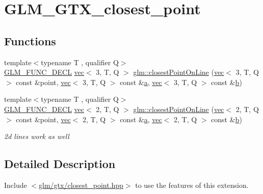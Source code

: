 \hypertarget{group__gtx__closest__point}{}\section{G\+L\+M\+\_\+\+G\+T\+X\+\_\+closest\+\_\+point}
\label{group__gtx__closest__point}
\subsection*{Functions}
\begin{DoxyCompactItemize}
\item 
{\footnotesize template$<$typename T , qualifier Q$>$ }\\\hyperlink{setup_8hpp_ab2d052de21a70539923e9bcbf6e83a51}{G\+L\+M\+\_\+\+F\+U\+N\+C\+\_\+\+D\+E\+CL} \hyperlink{structglm_1_1vec}{vec}$<$ 3, T, Q $>$ \hyperlink{group__gtx__closest__point_ga36529c278ef716986151d58d151d697d}{glm\+::closest\+Point\+On\+Line} (\hyperlink{structglm_1_1vec}{vec}$<$ 3, T, Q $>$ const \&point, \hyperlink{structglm_1_1vec}{vec}$<$ 3, T, Q $>$ const \&\hyperlink{_s_d_l__opengl__glext_8h_a3309789fc188587d666cda5ece79cf82}{a}, \hyperlink{structglm_1_1vec}{vec}$<$ 3, T, Q $>$ const \&\hyperlink{_s_d_l__opengl__glext_8h_a0f71581a41fd2264c8944126dabbd010}{b})
\item 
{\footnotesize template$<$typename T , qualifier Q$>$ }\\\hyperlink{setup_8hpp_ab2d052de21a70539923e9bcbf6e83a51}{G\+L\+M\+\_\+\+F\+U\+N\+C\+\_\+\+D\+E\+CL} \hyperlink{structglm_1_1vec}{vec}$<$ 2, T, Q $>$ \hyperlink{group__gtx__closest__point_ga55bcbcc5fc06cb7ff7bc7a6e0e155eb0}{glm\+::closest\+Point\+On\+Line} (\hyperlink{structglm_1_1vec}{vec}$<$ 2, T, Q $>$ const \&point, \hyperlink{structglm_1_1vec}{vec}$<$ 2, T, Q $>$ const \&\hyperlink{_s_d_l__opengl__glext_8h_a3309789fc188587d666cda5ece79cf82}{a}, \hyperlink{structglm_1_1vec}{vec}$<$ 2, T, Q $>$ const \&\hyperlink{_s_d_l__opengl__glext_8h_a0f71581a41fd2264c8944126dabbd010}{b})
\begin{DoxyCompactList}\small\item\em 2d lines work as well \end{DoxyCompactList}\end{DoxyCompactItemize}


\subsection{Detailed Description}
Include $<$\hyperlink{closest__point_8hpp}{glm/gtx/closest\+\_\+point.\+hpp}$>$ to use the features of this extension.

